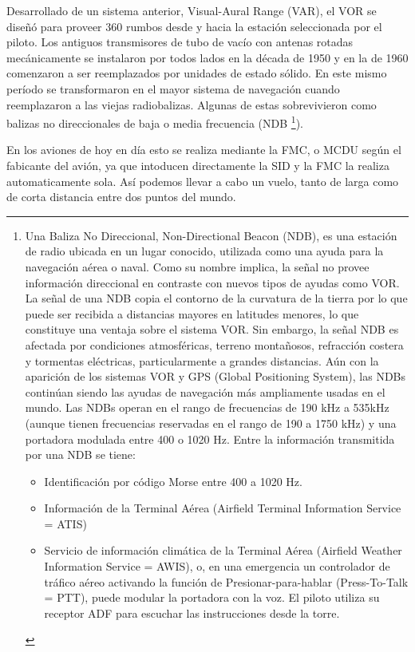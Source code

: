 Desarrollado de un sistema anterior, Visual-Aural Range (VAR), el VOR se dise\~n\'o para proveer 360 rumbos desde y hacia la estaci\'on seleccionada por el piloto. Los antiguos transmisores de tubo de vac\'io con antenas rotadas mec\'anicamente se instalaron por todos lados en la d\'ecada de 1950 y en la de 1960 comenzaron a ser reemplazados por unidades de estado s\'olido. En este mismo per\'iodo se transformaron en el mayor sistema de navegaci\'on cuando reemplazaron a las viejas radiobalizas. Algunas de estas sobrevivieron como balizas no direccionales de baja o media frecuencia (NDB \footnote{Una Baliza No Direccional,  Non-Directional Beacon (NDB), es una estaci\'on de radio ubicada en un lugar conocido, utilizada como una ayuda para la navegaci\'on a\'erea o naval. Como su nombre implica, la se\~nal no provee informaci\'on direccional en contraste con nuevos tipos de ayudas como VOR. La se\~nal de una NDB copia el contorno de la curvatura de la tierra por lo que puede ser recibida a distancias mayores en latitudes menores, lo que constituye una ventaja sobre el sistema VOR. Sin embargo, la se\~nal NDB es afectada por condiciones atmosf\'ericas, terreno monta\~nosos, refracci\'on costera y tormentas el\'ectricas, particularmente a grandes distancias. A\'un con la aparici\'on de los sistemas VOR y GPS (Global Positioning System), las NDBs contin\'uan siendo las ayudas de navegaci\'on m\'as ampliamente usadas en el mundo. Las NDBs operan en el rango de frecuencias de 190 kHz a 535kHz (aunque tienen frecuencias reservadas en el rango de 190 a 1750 kHz) y una portadora modulada entre  400 o 1020 Hz. Entre la informaci\'on transmitida por una NDB se tiene:

\begin{itemize}
 \item Identificaci\'on por c\'odigo Morse entre 400 a 1020 Hz.
\item Informaci\'on de la Terminal A\'erea (Airfield Terminal Information Service = ATIS)
\item Servicio de informaci\'on clim\'atica de la Terminal A\'erea (Airfield Weather Information Service = AWIS), o, en una emergencia un controlador de tr\'afico a\'ereo activando la funci\'on de Presionar-para-hablar (Press-To-Talk = PTT), puede modular la portadora con la voz. El piloto utiliza su receptor ADF para escuchar las instrucciones desde la torre.
\end{itemize}
}).

En los aviones de hoy en d\'ia esto se realiza mediante la FMC, o MCDU seg\'un el fabicante del avi\'on, ya que intoducen directamente la SID y la FMC la realiza automaticamente sola. As\'i podemos llevar a cabo un vuelo, tanto de larga como de corta distancia entre dos puntos del mundo.

